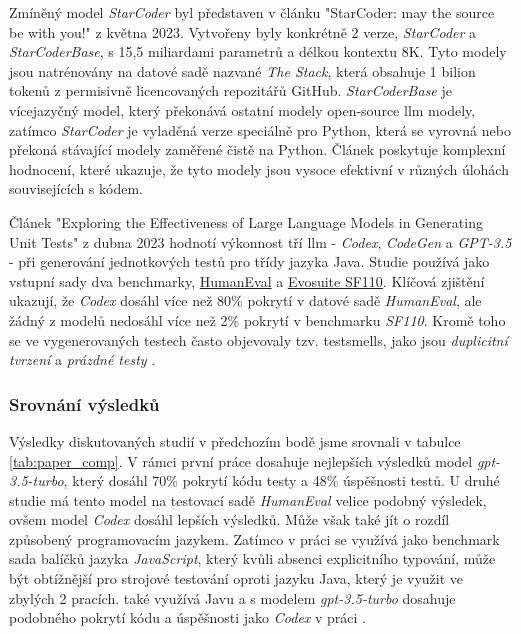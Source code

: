 \documentclass[czech, ma, kiv, he, iso690alph, pdf, viewonly]{fasthesis}
\begin{document}
    Zmíněný model \emph{StarCoder} byl představen v článku "StarCoder: may the source be with you!" \cite{StarCoder2023} z května 2023. Vytvořeny byly konkrétně 2 verze, \textit{StarCoder} a \textit{StarCoderBase}, s 15,5 miliardami parametrů a délkou kontextu 8K. Tyto modely jsou natrénovány na datové sadě nazvané \textit{The Stack}, která obsahuje 1 bilion tokenů z permisivně licencovaných repozitářů GitHub. \textit{StarCoderBase} je vícejazyčný model, který překonává ostatní modely open-source \gls{llm} modely, zatímco \textit{StarCoder} je vyladěná verze speciálně pro Python, která se vyrovná nebo překoná stávající modely zaměřené čistě na Python. Článek poskytuje komplexní hodnocení, které ukazuje, že tyto modely jsou vysoce efektivní v různých úlohách souvisejících s kódem.

    Článek "Exploring the Effectiveness of Large Language Models in Generating Unit Tests" \cite{siddiq2023exploring} z dubna 2023 hodnotí výkonnost tří \gls{llm} - \textit{Codex}, \textit{CodeGen} a \textit{GPT-3.5} - při generování jednotkových testů pro třídy jazyka Java. Studie používá jako vstupní sady dva benchmarky, \href{https://paperswithcode.com/dataset/humaneval-x}{HumanEval} a \href{https://paperswithcode.com/dataset/evosuite-sf110-benchmark}{Evosuite SF110}. Klíčová zjištění ukazují, že \textit{Codex} dosáhl více než 80\% pokrytí v datové sadě \textit{HumanEval}, ale žádný z modelů nedosáhl více než 2\% pokrytí v benchmarku \textit{SF110}. Kromě toho se ve vygenerovaných testech často objevovaly tzv. \gls{testsmells}, jako jsou \textit{duplicitní tvrzení} a \textit{prázdné testy} \cite{testsmells}.

    \subsubsection{Srovnání výsledků}
    Výsledky diskutovaných studií v předchozím bodě jsme srovnali v tabulce \ref{tab:paper_comp}. V rámci první práce dosahuje nejlepších výsledků model \textit{gpt-3.5-turbo}, který dosáhl 70\% pokrytí kódu testy a 48\% úspěšnosti testů. U druhé studie má tento model na testovací sadě \textit{HumanEval} velice podobný výsledek, ovšem model \textit{Codex} dosáhl lepších výsledků. Může však také jít o rozdíl způsobený programovacím jazykem. Zatímco v práci \cite{schafer2023empirical} se využívá jako benchmark sada balíčků jazyka \textit{JavaScript}, který kvůli absenci explicitního typování, může být obtížnější pro strojové testování oproti jazyku Java, který je využit ve zbylých 2 pracích. \cite{jutai} také využívá Javu a s modelem \textit{gpt-3.5-turbo} dosahuje podobného pokrytí kódu a úspěšnosti jako \textit{Codex} v práci \cite{siddiq2023exploring}.
\end{document}
